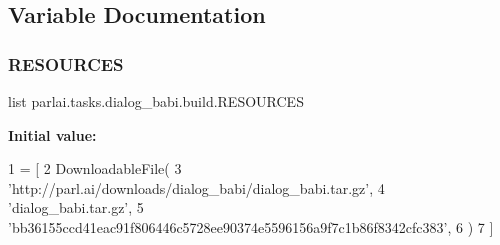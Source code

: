 \subsection{Variable Documentation}
\mbox{\label{namespaceparlai_1_1tasks_1_1dialog__babi_1_1build_a56f87771d583e88a5704c337bb2f569b}} 
\subsubsection{\texorpdfstring{R\+E\+S\+O\+U\+R\+C\+ES}{RESOURCES}}
{\footnotesize\ttfamily list parlai.\+tasks.\+dialog\+\_\+babi.\+build.\+R\+E\+S\+O\+U\+R\+C\+ES}

{\bfseries Initial value\+:}
\begin{DoxyCode}
1 =  [
2     DownloadableFile(
3         \textcolor{stringliteral}{'http://parl.ai/downloads/dialog\_babi/dialog\_babi.tar.gz'},
4         \textcolor{stringliteral}{'dialog\_babi.tar.gz'},
5         \textcolor{stringliteral}{'bb36155ccd41eac91f806446c5728ee90374e5596156a9f7c1b86f8342cfc383'},
6     )
7 ]
\end{DoxyCode}

